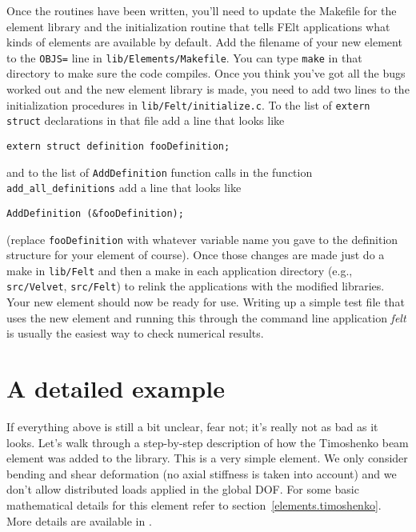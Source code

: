 Once the routines have been written, you'll need to update the Makefile for
the element library and the initialization routine that tells FElt applications
what kinds of elements are available by default. Add the filename of your new 
element to the {\tt OBJS=} line in \mbox{\tt lib/Elements/Makefile}.  You can 
type {\tt make} in that directory to make sure the code 
compiles.  Once you think you've got all the bugs worked out and the new
element library is made, you need to add two lines to the initialization 
procedures in \mbox{\tt lib/Felt/initialize.c}.  To the list of 
\mbox{\tt extern struct} declarations in that file add a line that looks like 
\begin{screen}
 \begin{verbatim}
extern struct definition fooDefinition;
 \end{verbatim}
\end{screen}
and to the list of {\tt AddDefinition} function calls in the function
{\tt add\_all\_definitions} add a line that looks like
\begin{screen}
 \begin{verbatim}
AddDefinition (&fooDefinition);
 \end{verbatim}
\end{screen}
(replace {\tt fooDefinition} with whatever variable name you gave to the
definition structure for your element of course). Once those changes are 
made just do a make in \mbox{\tt lib/Felt} and then a make in each application 
directory (e.g., \mbox{\tt src/Velvet}, \mbox{\tt src/Felt}) to relink the 
applications with the modified libraries.  Your new element should now be 
ready for use.  Writing up a simple test file that uses the new element and 
running this through the command line application {\em felt} is usually the 
easiest way to check numerical results.


\section{A detailed example}

If everything above is still a bit unclear, fear not; it's really not as 
bad as it looks.  Let's walk through a step-by-step description of how
the Timoshenko beam element was added to the \felt{} library.  This is
a very simple element.  We only consider bending and shear deformation
(no axial stiffness is taken into account) and we don't allow distributed loads
applied in the global DOF.  For some basic mathematical details for
this element refer to section~\ref{elements.timoshenko}.  More details
are available in \cite{kosmatka:timoshenko,htk:simple,td:hierarchy}.

